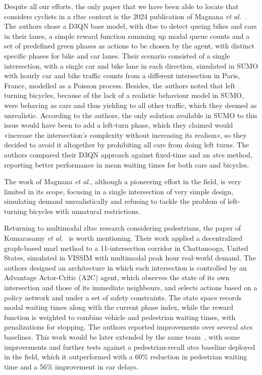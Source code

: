 Despite all our efforts, the only paper that we have been able to locate that considers cyclists in a \gls{rltsc} context is the 2024 publication of Magnana \textit{et al.}~\cite{Magnana2024}. The authors chose a D3QN base model, with \gls{dtse} to detect queing bikes and cars in their lanes, a simple reward function summing up modal queue counts and a set of predefined green phases as actions to be chosen by the agent, with distinct specific phases for bike and car lanes. Their scenario consisted of a single intersection, with a single car and bike lane in each direction, simulated in SUMO with hourly car and bike traffic counts from a different intersection in Paris, France, modelled as a Poisson process. Besides, the authors noted that left turning bicycles, because of the lack of a realistic behaviour model in SUMO, were behaving as cars and thus yielding to all other traffic, which they deemed as unrealistic. According to the authors, the only solution available in SUMO to this issue would have been to add a left-turn phase, which they claimed would «increase the intersection's complexity without increasing its realism», so they decided to avoid it altogether by prohibiting all cars from doing left turns. The authors compared their D3QN approach against fixed-time and an \gls{atcs} method, reporting better performance in mean waiting times for both cars and bicycles.

The work of Magnana \textit{et al.}, although a pioneering effort in the field, is very limited in its scope, focusing in a single intersection of very simple design, simulating demand unrealistically and refusing to tackle the problem of left-turning bicycles with unnatural restrictions.

\medskip

\noindent Returning to multimodal \gls{rltsc} research considering pedestrians, the paper of Kumarasamy \textit{et al.}~\cite{Kumarasamy2024} is worth mentioning. Their work applied a decentralized graph-based \gls{marl} method to a 11-intersection corridor in Chattanooga, United States, simulated in VISSIM with multimodal peak hour real-world demand. The authors designed an architecture in which each intersection is controlled by an Advantage Actor-Critic (A2C) agent, which observes the state of its own intersection and those of its immediate neighbours, and selects actions based on a policy network and under a set of safety constraints. The state space records modal waiting times along with the current phase index, while the reward function is weighted to combine vehicle and pedestrian waiting times, with penalizations for stopping. The authors reported improvements over several \gls{atcs} baselines. This work would be later extended by the same team~\cite{Kumarasamy2025}, with some improvements and further tests against a pedestrian-recall \gls{atcs} baseline deployed in the field, which it outperformed with a 60\% reduction in pedestrian waiting time and a 56\% improvement in car delays. 

